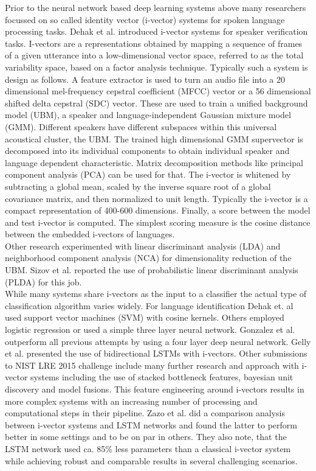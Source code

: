 Prior to the neural network based deep learning systems above many researchers focussed on so called identity vector (i-vector) systems for spoken language processing tasks. Dehak et al.\cite{dehak2011front} introduced i-vector systems for speaker verification tasks. I-vectors are a representations obtained by mapping a sequence of frames of a given utterance into a low-dimensional vector space, referred to as the total 	variability space, based on a factor analysis technique. Typically such a system is design as follows. A feature extractor is used to turn an audio file into a 20 dimensional mel-frequency cepstral coefficient (MFCC) vector or a 56 dimensional shifted delta cepstral (SDC) vector. These are used to train a unified background model (UBM), a speaker and language-independent Gaussian mixture model (GMM). Different speakers have different subspaces within this universal acoustical cluster, the UBM. The trained high dimensional GMM supervector is decomposed into its individual components to obtain individual speaker and language dependent characteristic. Matrix decomposition methods like principal component analysis (PCA) can be used for that. The i-vector is whitened by subtracting a global mean, scaled by the inverse square root of a global covariance matrix, and then normalized to unit length\cite{garcia2011analysis}. Typically the i-vector is a compact representation of 400-600 dimensions. Finally, a score between the model and test i-vector is computed. The simplest scoring measure is the cosine distance between the embedded i-vectors of languages.\\ 
Other research\cite{dehak2011front} experimented with linear discriminant analysis (LDA) and neighborhood component analysis (NCA) for dimensionality reduction of the UBM. Sizov et al. reported the use of probabilistic linear discriminant analysis (PLDA) for this job\cite{sizov2016discriminating}.\\
While many systems share i-vectors as the input to a classifier the actual type of classification algorithm varies widely. For language identification Dehak et. al\cite{dehak2011front} used support vector machines (SVM) with cosine kernels. Others\cite{martinez2011language} employed logistic regression or used a simple three layer neural network\cite{plchot2016bat}. Gonzalez et al.\cite{gonzalez2015frame} outperform all previous attempts by using a four layer deep neural network. Gelly et al.\cite{gelly2016language} presented the use of bidirectional LSTMs with i-vectors. Other submissions\cite{lee20162015, torres2008mitll, ng2016sheffield} to NIST LRE 2015 challenge\cite{lre2015} include many further research and approach with i-vector systems including the use of stacked bottleneck features, bayesian unit discovery and model fusions. This feature engineering around i-vectors results in more complex systems with an increasing number of processing and computational steps in their pipeline. Zazo et al.\cite{zazo2016evaluation} did a comparison analysis between i-vector systems and LSTM networks and found the latter to perform better in some settings and to be on par in others. They also note, that the LSTM network used ca. 85\% less parameters than a classical i-vector system while achieving robust and comparable results in several challenging scenarios.


